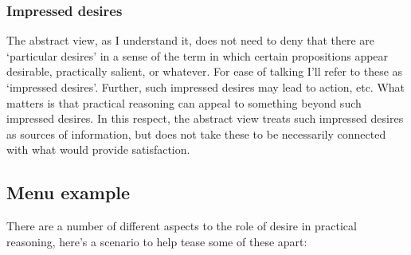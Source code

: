 \documentclass[10pt]{article}
\begin{document}
\subsubsection{Impressed desires}
\label{sec:impressions}

The abstract view, as I understand it, does not need to deny that there are `particular desires' in a sense of the term in which certain propositions appear desirable, practically salient, or whatever.
For ease of talking I'll refer to these as `impressed desires'.
Further, such impressed desires may lead to action, etc.
What matters is that practical reasoning can appeal to something beyond such impressed desires.
In this respect, the abstract view treats such impressed desires as sources of information, but does not take these to be necessarily connected with what would provide satisfaction.


\subsection{Menu example}
\label{sec:menu-example}

There are a number of different aspects to the role of desire in practical reasoning, here's a scenario to help tease some of these apart:
\end{document}
